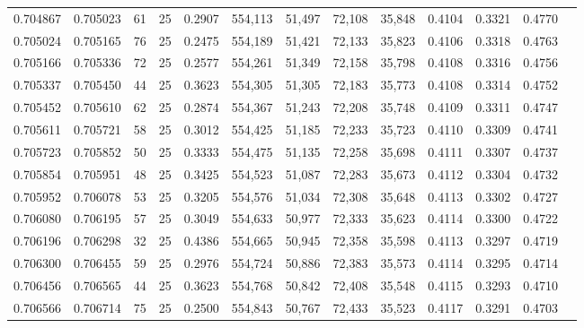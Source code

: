\begin{tabular}{rrrrrrrrrrrrr}
0.704867 & 0.705023 &    61 &  25 &                                     0.2907 & 554,113 &  51,497 &  72,108 &  35,848 & 0.4104 & 0.3321 & 0.4770 \\
0.705024 & 0.705165 &    76 &  25 &                                     0.2475 & 554,189 &  51,421 &  72,133 &  35,823 & 0.4106 & 0.3318 & 0.4763 \\
0.705166 & 0.705336 &    72 &  25 &                                     0.2577 & 554,261 &  51,349 &  72,158 &  35,798 & 0.4108 & 0.3316 & 0.4756 \\
0.705337 & 0.705450 &    44 &  25 &                                     0.3623 & 554,305 &  51,305 &  72,183 &  35,773 & 0.4108 & 0.3314 & 0.4752 \\
0.705452 & 0.705610 &    62 &  25 &                                     0.2874 & 554,367 &  51,243 &  72,208 &  35,748 & 0.4109 & 0.3311 & 0.4747 \\
0.705611 & 0.705721 &    58 &  25 &                                     0.3012 & 554,425 &  51,185 &  72,233 &  35,723 & 0.4110 & 0.3309 & 0.4741 \\
0.705723 & 0.705852 &    50 &  25 &                                     0.3333 & 554,475 &  51,135 &  72,258 &  35,698 & 0.4111 & 0.3307 & 0.4737 \\
0.705854 & 0.705951 &    48 &  25 &                                     0.3425 & 554,523 &  51,087 &  72,283 &  35,673 & 0.4112 & 0.3304 & 0.4732 \\
0.705952 & 0.706078 &    53 &  25 &                                     0.3205 & 554,576 &  51,034 &  72,308 &  35,648 & 0.4113 & 0.3302 & 0.4727 \\
0.706080 & 0.706195 &    57 &  25 &                                     0.3049 & 554,633 &  50,977 &  72,333 &  35,623 & 0.4114 & 0.3300 & 0.4722 \\
0.706196 & 0.706298 &    32 &  25 &                                     0.4386 & 554,665 &  50,945 &  72,358 &  35,598 & 0.4113 & 0.3297 & 0.4719 \\
0.706300 & 0.706455 &    59 &  25 &                                     0.2976 & 554,724 &  50,886 &  72,383 &  35,573 & 0.4114 & 0.3295 & 0.4714 \\
0.706456 & 0.706565 &    44 &  25 &                                     0.3623 & 554,768 &  50,842 &  72,408 &  35,548 & 0.4115 & 0.3293 & 0.4710 \\
0.706566 & 0.706714 &    75 &  25 &                                     0.2500 & 554,843 &  50,767 &  72,433 &  35,523 & 0.4117 & 0.3291 & 0.4703 \\

\end{tabular}
